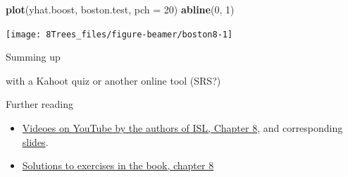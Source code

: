 \documentclass[10pt,ignorenonframetext,]{beamer}
\newenvironment{Shaded}{\begin{snugshade}}{\end{snugshade}}
\newcommand{\KeywordTok}[1]{\textcolor[rgb]{0.13,0.29,0.53}{\textbf{#1}}}
\newcommand{\DataTypeTok}[1]{\textcolor[rgb]{0.13,0.29,0.53}{#1}}
\newcommand{\DecValTok}[1]{\textcolor[rgb]{0.00,0.00,0.81}{#1}}
\newcommand{\NormalTok}[1]{#1}
\begin{document}
\begin{frame}[fragile]

\scriptsize

\begin{Shaded}
\begin{Highlighting}[]
\KeywordTok{plot}\NormalTok{(yhat.boost, boston.test, }\DataTypeTok{pch =} \DecValTok{20}\NormalTok{)}
\KeywordTok{abline}\NormalTok{(}\DecValTok{0}\NormalTok{, }\DecValTok{1}\NormalTok{)}
\end{Highlighting}
\end{Shaded}

\begin{center}\texttt{[image: 8Trees\_files/figure-beamer/boston8-1]} \end{center}

\end{frame}

\begin{frame}{Summing up}

with a Kahoot quiz or another online tool (SRS?)

\end{frame}

\begin{frame}{Further reading}

\begin{itemize}
\item
  \href{https://www.youtube.com/playlist?list=PL5-da3qGB5IB23TLuA8ZgVGC8hV8ZAdGh}{Videoes
  on YouTube by the authors of ISL, Chapter 8}, and corresponding
  \href{https://lagunita.stanford.edu/c4x/HumanitiesScience/StatLearning/asset/trees.pdf}{slides}.
\item
  \href{https://rstudio-pubs-static.s3.amazonaws.com/65564_925dfde884e14ef9b5735eddd16c263e.html}{Solutions
  to exercises in the book, chapter 8}
\end{itemize}

\end{frame}
\end{document}
